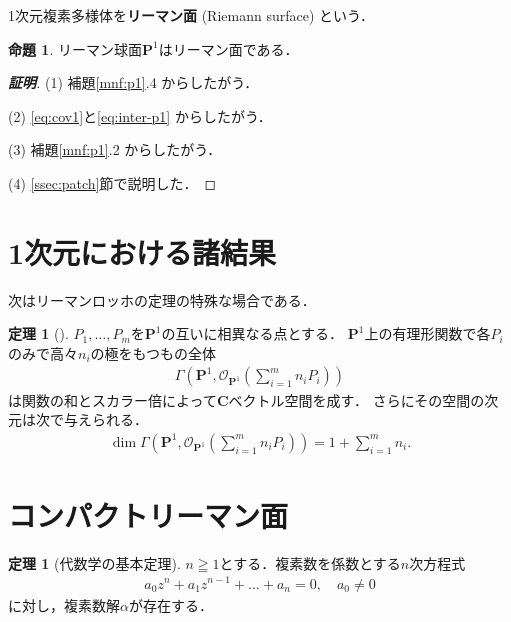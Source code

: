 \documentclass[11pt, a4paper, dvipdfmx, draft]{jsarticle}
\theoremstyle{definition}
\newtheorem{Theorem}[Axiom]{定理}
\newtheorem{Proposition}[Axiom]{命題}
\newcommand{\cc}{\mathbf{C}}
\newcommand{\pp}{\mathbf{P}}
\newcommand{\mcal}{\mathcal}
\newcommand{\OO}{\mcal{O}}
\theoremstyle{mystyle}
\numberwithin{equation}{section} %
\begin{document}
1次元複素多様体を\textbf{リーマン面} (Riemann surface) という．

\begin{Proposition}
    リーマン球面$\pp^1$はリーマン面である．    
\end{Proposition}

\begin{proof}[\bf{証明}]
    (1) 
    補題\ref{mnf:p1}.4 からしたがう．

    (2) 
    \eqref{eq:cov1}と\eqref{eq:inter-p1} からしたがう．

    (3) 
    補題\ref{mnf:p1}.2 からしたがう．

    (4) 
    \ref{ssec:patch}節で説明した．
\end{proof}

\section{1次元における諸結果}


次はリーマンロッホの定理の特殊な場合である．

\begin{Theorem}[{\cite[命題1.14]{ogs}}]
    $P_{1},\dots,P_{m}$を$\pp^{1}$の互いに相異なる点とする．
    $\pp^{1}$上の有理形関数で各$P_i$のみで高々$n_i$の極をもつもの全体
    \begin{align*}
        \Gamma\left(\pp^{1}, \OO_{\pp^{1}}\left(\sum_{i=1}^{m}n_{i}P_{i}\right)\right)
    \end{align*}
    は関数の和とスカラー倍によって$\cc$ベクトル空間を成す．
    さらにその空間の次元は次で与えられる．
    \begin{align*}
        \dim\Gamma\left(
            \pp^{1}, \OO_{\pp^{1}}\left(
                \sum_{i=1}^{m}n_{i}P_{i}
                \right)
            \right)
        = 1+\sum_{i=1}^{m}n_{i}.
    \end{align*}
\end{Theorem}


\section{コンパクトリーマン面}

\begin{Theorem}[代数学の基本定理{\cite[系2.24]{ogs}}]
    $n\geqq1$とする．複素数を係数とする$n$次方程式
    \begin{align*}
        a_{0}z^{n}+a_{1}z^{n-1}+\dots +a_{n}=0,\quad a_{0}\neq 0
    \end{align*}
    に対し，複素数解$\alpha$が存在する．
\end{Theorem}
\end{document}
